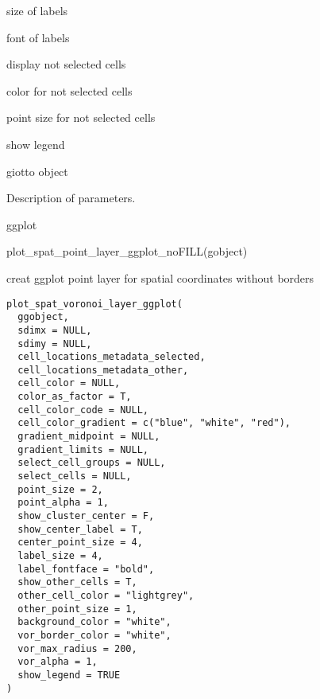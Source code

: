\documentclass[a4paper]{book}
\begin{document}
\begin{Arguments}
\begin{ldescription}
\item[\code{label\_size}] size of labels

\item[\code{label\_fontface}] font of labels

\item[\code{show\_other\_cells}] display not selected cells

\item[\code{other\_cell\_color}] color for not selected cells

\item[\code{other\_point\_size}] point size for not selected cells

\item[\code{show\_legend}] show legend

\item[\code{gobject}] giotto object
\end{ldescription}
\end{Arguments}
%
\begin{Details}\relax
Description of parameters.
\end{Details}
%
\begin{Value}
ggplot
\end{Value}
%
\begin{Examples}
\begin{ExampleCode}
    plot_spat_point_layer_ggplot_noFILL(gobject)
\end{ExampleCode}
\end{Examples}
%
\begin{Description}\relax
creat ggplot point layer for spatial coordinates without borders
\end{Description}
%
\begin{Usage}
\begin{verbatim}
plot_spat_voronoi_layer_ggplot(
  ggobject,
  sdimx = NULL,
  sdimy = NULL,
  cell_locations_metadata_selected,
  cell_locations_metadata_other,
  cell_color = NULL,
  color_as_factor = T,
  cell_color_code = NULL,
  cell_color_gradient = c("blue", "white", "red"),
  gradient_midpoint = NULL,
  gradient_limits = NULL,
  select_cell_groups = NULL,
  select_cells = NULL,
  point_size = 2,
  point_alpha = 1,
  show_cluster_center = F,
  show_center_label = T,
  center_point_size = 4,
  label_size = 4,
  label_fontface = "bold",
  show_other_cells = T,
  other_cell_color = "lightgrey",
  other_point_size = 1,
  background_color = "white",
  vor_border_color = "white",
  vor_max_radius = 200,
  vor_alpha = 1,
  show_legend = TRUE
)
\end{verbatim}
\end{Usage}
\end{document}
